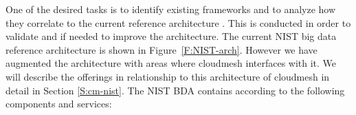 
One of the desired tasks is to identify existing frameworks and to
analyze how they correlate to the current reference architecture
\cite{nist-bd}. This is conducted in order to validate and if needed
to improve the architecture.  The current NIST big data reference
architecture is shown in Figure~\ref{F:NIST-arch}. However we have
augmented the architecture with areas where cloudmesh interfaces with
it. We will describe the offerings in relationship to this
architecture of cloudmesh in detail in Section \ref{S:cm-nist}.  The
NIST BDA contains according to \cite{nist-bd} the following
components and services:



